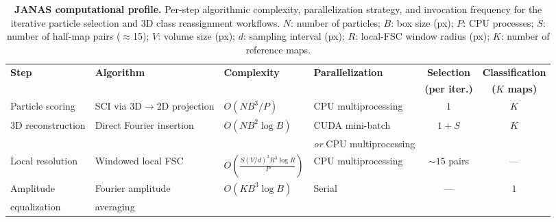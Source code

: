 %

\begin{table}[!ht]
\caption{\textbf{JANAS computational profile.}
Per-step algorithmic complexity, parallelization strategy, and invocation frequency for the iterative particle selection and 3D class reassignment workflows.
$N$: number of particles; $B$: box size (px); $P$: CPU processes; $S$: number of half-map pairs ($\approx$15); $V$: volume size (px); $d$: sampling interval (px); $R$: local-FSC window radius (px); $K$: number of reference maps.}
\label{tab:computational_profile}
\centering
\small
\begin{tabular}{@{}l l l l c c@{}}
\toprule
\textbf{Step} & \textbf{Algorithm} & \textbf{Complexity} & \textbf{Parallelization} & \textbf{Selection} & \textbf{Classification} \\
              &                    &                     &                          & \textbf{(per iter.)} & \textbf{($K$ maps)} \\
\midrule
Particle scoring  & SCI via 3D$\to$2D projection       & $O(NB^3/P)$               & CPU multiprocessing          & $1$       & $K$ \\[4pt]
3D reconstruction & Direct Fourier insertion             & $O(NB^2 \log B)$          & CUDA mini-batch              & $1 + S$   & $K$ \\
                  &                                      &                           & \textit{or} CPU multiprocessing &         &     \\[4pt]
Local resolution  & Windowed local FSC                   & $O\!\left(\frac{S(V/d)^3 R^3 \log R}{P}\right)$ & CPU multiprocessing & $\sim\!15$ pairs & --- \\[4pt]
Amplitude         & Fourier amplitude                    & $O(KB^3 \log B)$          & Serial                       & ---       & $1$ \\
\quad equalization & \quad averaging                     &                           &                              &           &     \\
\bottomrule
\end{tabular}
\end{table}
